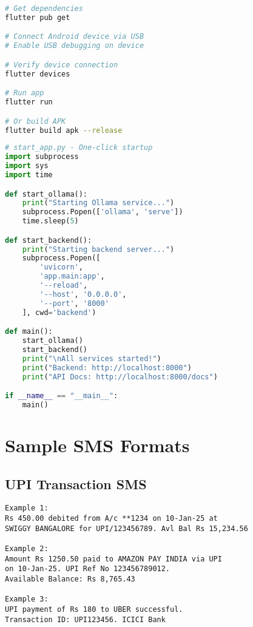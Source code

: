 \documentclass[11pt,a4paper]{report}
\begin{document}
\begin{itemize}
\begin{lstlisting}[language=bash]
# Get dependencies
flutter pub get

# Connect Android device via USB
# Enable USB debugging on device

# Verify device connection
flutter devices

# Run app
flutter run

# Or build APK
flutter build apk --release
\end{lstlisting}


\begin{lstlisting}[language=Python]
# start_app.py - One-click startup
import subprocess
import sys
import time

def start_ollama():
    print("Starting Ollama service...")
    subprocess.Popen(['ollama', 'serve'])
    time.sleep(5)

def start_backend():
    print("Starting backend server...")
    subprocess.Popen([
        'uvicorn',
        'app.main:app',
        '--reload',
        '--host', '0.0.0.0',
        '--port', '8000'
    ], cwd='backend')

def main():
    start_ollama()
    start_backend()
    print("\nAll services started!")
    print("Backend: http://localhost:8000")
    print("API Docs: http://localhost:8000/docs")

if __name__ == "__main__":
    main()
\end{lstlisting}

\chapter{Sample SMS Formats}

\section{UPI Transaction SMS}

\begin{lstlisting}
Example 1:
Rs 450.00 debited from A/c **1234 on 10-Jan-25 at 
SWIGGY BANGALORE for UPI/123456789. Avl Bal Rs 15,234.56

Example 2:
Amount Rs 1250.50 paid to AMAZON PAY INDIA via UPI 
on 10-Jan-25. UPI Ref No 123456789012. 
Available Balance: Rs 8,765.43

Example 3:
UPI payment of Rs 180 to UBER successful. 
Transaction ID: UPI123456. ICICI Bank
\end{lstlisting}


\end{itemize}
\end{document}
